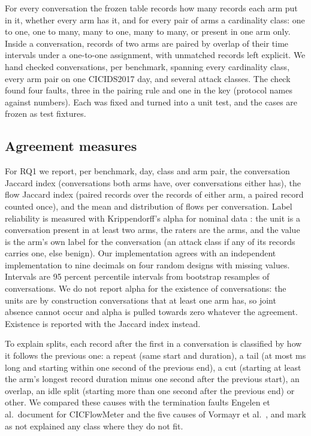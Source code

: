 \documentclass[pdflatex,sn-mathphys-num]{sn-jnl}
\newcommand{\setnum}[1]{#1}
\newcommand{\cicids}{CICIDS2017}
\theoremstyle{thmstyleone}%
\theoremstyle{thmstylethree}%
\begin{document}
For every conversation the frozen table records how many records each arm put in it, whether every arm has it, and for every pair of arms a cardinality class: one to one, one to many, many to one, many to many, or present in one arm only. Inside a conversation, records of two arms are paired by overlap of their time intervals under a one-to-one assignment, with unmatched records left explicit. We hand checked \NhandCases{} conversations, \NhandPerBench{} per benchmark, spanning every cardinality class, every arm pair on one \cicids{} day, and several attack classes. The check found four faults, three in the pairing rule and one in the key (protocol names against numbers). Each was fixed and turned into a unit test, and the \NhandCases{} cases are frozen as test fixtures.

\subsection{Agreement measures}\label{sec:agree}

For RQ1 we report, per benchmark, day, class and arm pair, the conversation Jaccard index (conversations both arms have, over conversations either has), the flow Jaccard index (paired records over the records of either arm, a paired record counted once), and the mean and distribution of flows per conversation. Label reliability is measured with Krippendorff's alpha for nominal data \cite{hayes2007}: the unit is a conversation present in at least two arms, the raters are the arms, and the value is the arm's own label for the conversation (an attack class if any of its records carries one, else benign). Our implementation agrees with an independent implementation to nine decimals on four random designs with missing values. Intervals are \setnum{95} percent percentile intervals from \SetBoot{} bootstrap resamples of conversations. We do not report alpha for the existence of conversations: the units are by construction conversations that at least one arm has, so joint absence cannot occur and alpha is pulled towards zero whatever the agreement. Existence is reported with the Jaccard index instead.

To explain splits, each record after the first in a conversation is classified by how it follows the previous one: a repeat (same start and duration), a tail (at most \SetTailMs{} ms long and starting within one second of the previous end), a cut (starting at least the arm's longest record duration minus one second after the previous start), an overlap, an idle split (starting more than one second after the previous end) or other. We compared these causes with the termination faults Engelen et al.\ document for CICFlowMeter \cite{engelen2021} and the five causes of Vormayr et al.\ \cite{vormayr2020}, and mark as not explained any class where they do not fit.
\end{document}
